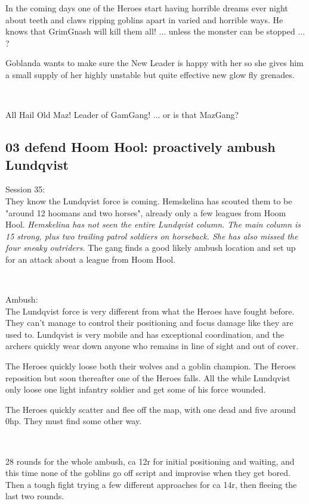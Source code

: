 In the coming days one of the Heroes start having horrible dreams ever night about teeth and claws ripping goblins apart in varied and horrible ways. He knows that GrimGnash will kill them all! ... unless the monster can be stopped ... ?

Goblanda wants to make sure the New Leader is happy with her so she gives him a small supply of her highly unstable but quite effective new glow fly grenades.

\

\noindent All Hail Old Maz! Leader of GamGang! ... or is that MazGang?


\subsection*{03 defend Hoom Hool: proactively ambush Lundqvist}


\forceindent Session 35:\\                                              %
They know the Lundqvist force is coming. Hemskelina has scouted them to be "around 12 hoomans and two horses", already only a few leagues from Hoom Hool.
\emph{Hemskelina has not seen the entire Lundqvist column. The main column is 15 strong, plus two trailing patrol soldiers on horseback. She has also missed the four sneaky outriders.}
The gang finds a good likely ambush location and set up for an attack about a league from Hoom Hool.

\

Ambush:\\
The Lundqvist force is very different from what the Heroes have fought before. They can't manage to control their positioning and focus damage like they are used to. Lundqvist is very mobile and has exceptional coordination, and the archers quickly wear down anyone who remains in line of sight and out of cover. 

The Heroes quickly loose both their wolves and a goblin champion. The Heroes reposition but soon thereafter one of the Heroes falls. All the while Lundqvist only loose one light infantry soldier and get some of his force wounded.

The Heroes quickly scatter and flee off the map, with one dead and five around 0hp. They must find some other way.

\

28 rounds for the whole ambush, ca 12r for initial positioning and waiting, and this time none of the goblins go off script and improvise when they get bored. Then a tough fight trying a few different approaches for ca 14r, then fleeing the last two rounds.


